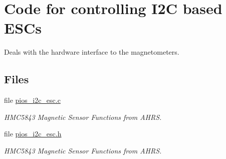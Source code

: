 \hypertarget{group___p_i_o_s___i2_c___e_s_c}{\section{Code for controlling I2\-C based E\-S\-Cs}
\label{group___p_i_o_s___i2_c___e_s_c}
}


Deals with the hardware interface to the magnetometers.  


\subsection*{Files}
\begin{DoxyCompactItemize}
\item 
file \hyperlink{pios__i2c__esc_8c}{pios\-\_\-i2c\-\_\-esc.\-c}
\begin{DoxyCompactList}\small\item\em H\-M\-C5843 Magnetic Sensor Functions from A\-H\-R\-S. \end{DoxyCompactList}\item 
file \hyperlink{pios__i2c__esc_8h}{pios\-\_\-i2c\-\_\-esc.\-h}
\begin{DoxyCompactList}\small\item\em H\-M\-C5843 Magnetic Sensor Functions from A\-H\-R\-S. \end{DoxyCompactList}\end{DoxyCompactItemize}
